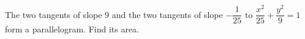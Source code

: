 The two tangents of slope $9$ and the two tangents of slope $-\dfrac{1}{25}$ to $\dfrac{x^2}{25}+\dfrac{y^2}{9}=1$ form a parallelogram. Find its area.

